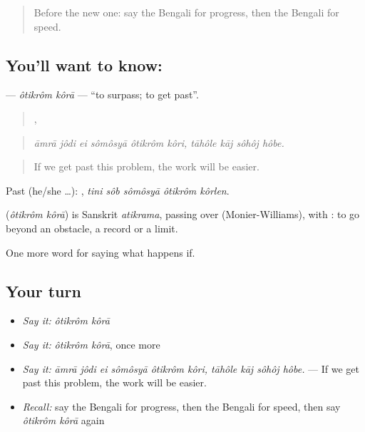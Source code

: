 \label{lesson:BN-C377-otikrom-kora}



\begin{quote}
Before the new one: say the Bengali for progress, then the Bengali for speed.
\end{quote}

\subsection*{You'll want to know:  }
\textbf{ } — \emph{ôtikrôm kôrā} — \textquotedblleft{}to surpass; to get past\textquotedblright{}.

\begin{quote}
     ,    
\end{quote}

\begin{quote}
\emph{āmrā jôdi ei sômôsyā ôtikrôm kôri, tāhôle kāj sôhôj hôbe.}
\end{quote}

\begin{quote}
If we get past this problem, the work will be easier.
\end{quote}

Past (he/she …):     , \emph{tini sôb sômôsyā ôtikrôm kôrlen}.

\begin{cousinweb}
\textbf{ } (\emph{ôtikrôm kôrā}) is Sanskrit \emph{atikrama}, passing over (Monier-Williams), with : to go beyond an obstacle, a record or a limit.
\end{cousinweb}

\begin{grammarlens}[title={What you've built}]
One more word for saying what happens if.
\end{grammarlens}

\subsection*{Your turn}
\begin{itemize}
\raggedright
  \item \emph{Say it:} \emph{ôtikrôm kôrā}
  \item \emph{Say it:} \emph{ôtikrôm kôrā}, once more
  \item \emph{Say it:} \emph{āmrā jôdi ei sômôsyā ôtikrôm kôri, tāhôle kāj sôhôj hôbe.} — If we get past this problem, the work will be easier.
  \item \emph{Recall:} say the Bengali for progress, then the Bengali for speed, then say \emph{ôtikrôm kôrā} again
\end{itemize}


